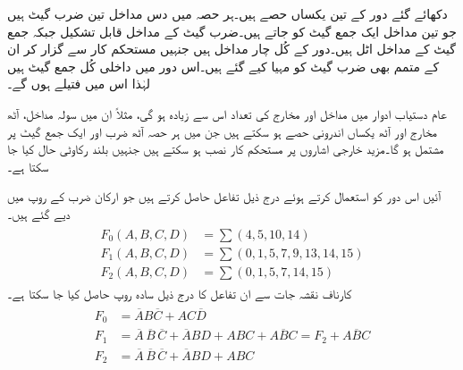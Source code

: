 دکھائے گئے دور کے تین یکساں حصے ہیں۔ہر حصہ میں دس مداخل تین ضرب گیٹ ہیں جو تین مداخل ایک جمع گیٹ کو جاتے ہیں۔ضرب گیٹ کے مداخل قابل تشکیل جبکہ جمع گیٹ کے مداخل اٹل ہیں۔دور کے کُل چار مداخل ہیں جنہیں مستحکم کار سے گزار کر ان کے متمم بھی ضرب گیٹ کو مہیا کیے گئے ہیں۔اس دور میں  داخلی کُل جمع گیٹ ہیں لہٰذا اس میں  فتیلے ہوں گے۔

عام دستیاب ادوار میں مداخل اور مخارج کی تعداد اس سے زیادہ ہو گی، مثلاً ان میں سولہ مداخل، آٹھ مخارج اور آٹھ یکساں اندرونی حصے ہو سکتے ہیں جن میں ہر حصہ آٹھ ضرب اور ایک جمع گیٹ پر مشتمل ہو گا۔مزید خارجی اشاروں پر مستحکم کار نصب ہو سکتے ہیں جنہیں بلند رکاوٹی حال کیا جا سکتا ہے۔

آئیں اس دور کو استعمال کرتے ہوئے درج ذیل تفاعل حاصل کرتے ہیں جو ارکان ضرب کے روپ میں دیے گئے ہیں۔
\begin{gather}
\begin{aligned}
F_0(A,B,C,D)&=\sum(4,5,10,14)\\
F_1(A,B,C,D)&=\sum(0,1,5,7,9,13,14,15)\\
F_2(A,B,C,D)&=\sum(0,1,5,7,14,15)
\end{aligned}
\end{gather}
کارناف نقشہ جات سے ان تفاعل کا  درج ذیل سادہ روپ  حاصل کیا جا سکتا ہے۔
\begin{gather}
\begin{aligned}
F_0&=\overline{A}B\overline{C}+AC\overline{D}\\
F_1&=\overline{A}\,\overline{B}\,\overline{C}+\overline{A}BD+ABC+A\overline{B}C=F_2+A\overline{B}C\\
F_2&=\overline{A}\,\overline{B}\,\overline{C}+\overline{A}BD+ABC
\end{aligned}
\end{gather}

